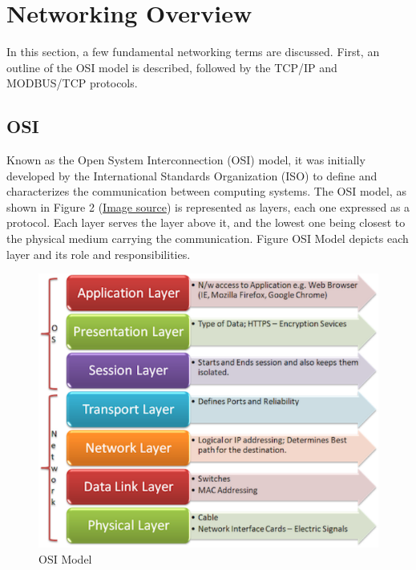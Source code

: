 \documentclass[12pt,]{article}
\begin{document}
\pagebreak

\section{Networking Overview}\label{networking-overview}

In this section, a few fundamental networking terms are discussed.
First, an outline of the OSI model is described, followed by the TCP/IP
and MODBUS/TCP protocols.

\subsection{OSI}\label{osi}

Known as the Open System Interconnection (OSI) model, it was initially
developed by the International Standards Organization (ISO) to define
and characterizes the communication between computing systems. The OSI
model, as shown in Figure 2
(\href{https://engineering.linkedin.com/endorsements/geographic-trends-skills-using-linkedins-endorsement-feature}{Image
source}) is represented as layers, each one expressed as a protocol.
Each layer serves the layer above it, and the lowest one being closest
to the physical medium carrying the communication. Figure OSI Model
depicts each layer and its role and responsibilities.

\begin{figure}

{\centering \includegraphics{thesis_files/figure-latex/unnamed-chunk-5-1} 

}

\caption{OSI Model}\label{fig:unnamed-chunk-5}
\end{figure}
\end{document}
